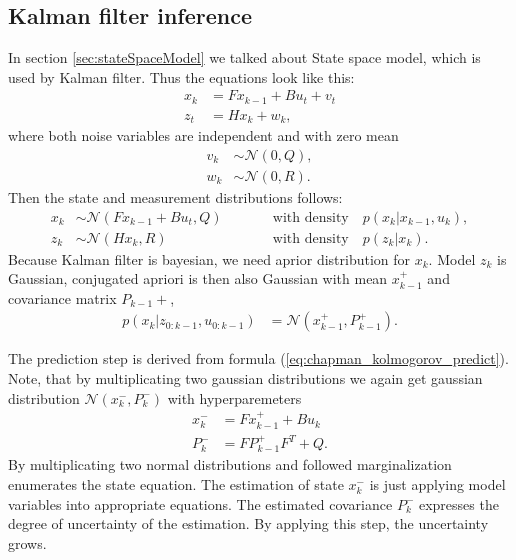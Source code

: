 \subsection{Kalman filter inference}
In section \ref{sec:stateSpaceModel} we talked about State space model, which is used by Kalman filter. Thus the
equations look like this:
\begin{align}
    x_k &= Fx_{k-1} + Bu_t + v_t \\
    z_t &= Hx_k + w_k,
\end{align}
where both noise variables are independent and with zero mean
\begin{align}
    v_k &\sim \mathcal{N}(0,Q), \\
    w_k &\sim \mathcal{N}(0,R).
\end{align}
Then the state and measurement distributions follows:
\begin{align}
    x_k &\sim \mathcal{N}(Fx_{k-1} + Bu_t,Q) \qquad && \text{with density}\quad p(x_k|x_{k-1},u_k), \\
    z_k &\sim  \mathcal{N}(Hx_k,R) \qquad && \text{with density}\quad p(z_k|x_k).
\end{align}
Because Kalman filter is bayesian, we need aprior distribution for $x_k$. Model $z_k$ is Gaussian, conjugated apriori
is then also Gaussian with mean $x_{k-1}^+$ and covariance matrix $P_{k-1}+$,
\begin{align}
    p(x_k|z_{0:k-1},u_{0:k-1}) &= \mathcal{N}(x_{k-1}^+,P_{k-1}^+).
\end{align}

The prediction step is derived from formula (\ref{eq:chapman_kolmogorov_predict}). Note, that by multiplicating two
gaussian distributions we again get gaussian distribution $\mathcal{N}(x_k^-,P_k^-)$ with hyperparemeters
\begin{align}
    x_k^- &= Fx_{k-1}^+ + Bu_k \\
    P_k^- &= FP_{k-1}^{+}F^T + Q.
\end{align}
By multiplicating two normal distributions and followed marginalization enumerates the state equation. The estimation
of state $x_k^-$ is just applying model variables into appropriate equations. The estimated covariance $P_k^-$
expresses the degree of uncertainty of the estimation. By applying this step, the uncertainty grows.

